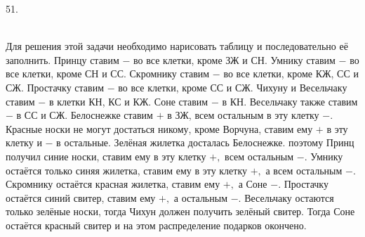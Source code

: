 51.
\begin{figure}[ht!]
\end{figure}\\
Для решения этой задачи необходимо нарисовать таблицу и последовательно её заполнить. Принцу ставим $-$ во все клетки, кроме ЗЖ и СН. Умнику ставим $-$ во все клетки, кроме СН и СС. Скромнику ставим $-$ во все клетки, кроме КЖ, СС и СЖ. Простачку ставим $-$ во все клетки, кроме СС и СЖ. Чихуну и Весельчаку ставим $-$ в клетки КН, КС и КЖ. Соне ставим $-$ в КН. Весельчаку также ставим $-$ в СС и СЖ. Белоснежке ставим $+$ в ЗЖ, всем остальным в эту клетку $-$. Красные носки не могут достаться никому, кроме Ворчуна, ставим ему $+$ в эту клетку и $-$ в остальные. Зелёная жилетка досталась Белоснежке. поэтому Принц получил синие носки, ставим ему в эту клетку $+,$ всем остальным $-.$ Умнику остаётся только синяя жилетка, ставим ему в эту клетку $+,$ а всем остальным $-.$ Скромнику остаётся красная жилетка, ставим ему $+,$ а Соне $-.$ Простачку остаётся синий свитер, ставим ему $+,$ а остальным $-.$ Весельчаку остаются только зелёные носки, тогда Чихун должен получить зелёный свитер. Тогда Соне остаётся красный свитер и на этом распределение подарков окончено.\\
